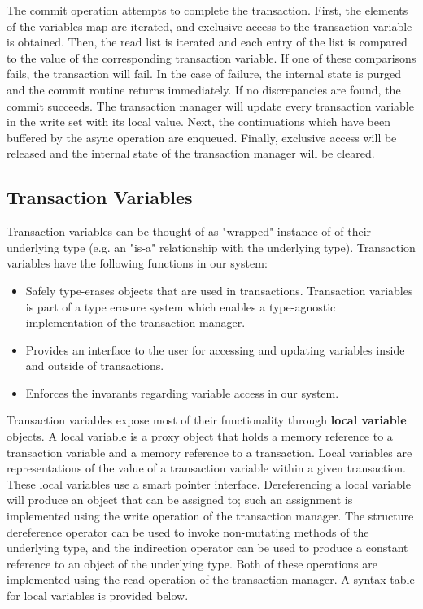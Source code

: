 \documentclass[conference]{IEEEtran}
\begin{document}
The commit operation attempts to complete the transaction. First, the elements of the variables map are iterated, and exclusive access to the transaction variable is obtained. Then, the read list is iterated and each entry of the list is compared to the value of the corresponding transaction variable. If one of these comparisons fails, the transaction will fail. In the case of failure, the internal state is purged and the commit routine returns immediately. If no discrepancies are found, the commit succeeds. The transaction manager will update every transaction variable in the write set with its local value. Next, the continuations which have been buffered by the async operation are enqueued. Finally, exclusive access will be released and the internal state of the transaction manager will be cleared.

\subsection{Transaction Variables}

Transaction variables can be thought of as "wrapped" instance of of their underlying type (e.g. an "is-a" relationship with the underlying type). Transaction variables have the following functions in our system:

\begin{itemize}
\item Safely type-erases objects that are used in transactions. Transaction variables is
part of a type erasure system which enables a type-agnostic implementation of
the transaction manager.
\item Provides an interface to the user for accessing and updating variables
inside and outside of transactions.
\item Enforces the invarants regarding variable access in our system.
\end{itemize}

Transaction variables expose most of their functionality through \textbf{local variable} objects. A local variable is a proxy object that holds a memory reference to a transaction variable and a memory reference to a transaction. Local variables are representations of the value of a transaction variable within a given transaction. These local variables use a smart pointer interface. Dereferencing a local variable will produce an object that can be assigned to; such an assignment is implemented using the write operation of the transaction manager. The structure dereference operator can be used to invoke non-mutating methods of the underlying type, and the indirection operator can be used to produce a constant reference to an object of the underlying type. Both of these operations are implemented using the read operation of the transaction manager. A syntax table for local variables is provided below.
\end{document}
